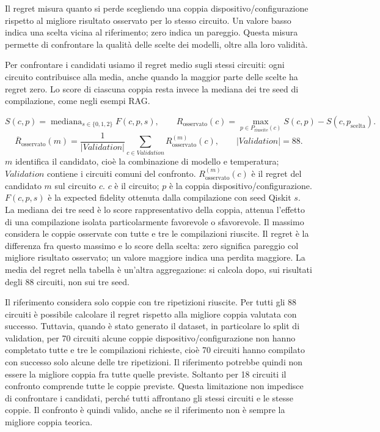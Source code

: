 Il regret misura quanto si perde scegliendo una coppia dispositivo/configurazione rispetto al migliore risultato osservato per lo stesso circuito. Un valore basso indica una scelta vicina al riferimento; zero indica un pareggio. Questa misura permette di confrontare la qualit\`a delle scelte dei modelli, oltre alla loro validit\`a.

Per confrontare i candidati usiamo il regret medio sugli stessi circuiti: ogni circuito contribuisce alla media, anche quando la maggior parte delle scelte ha regret zero. Lo score di ciascuna coppia resta invece la mediana dei tre seed di compilazione, come negli esempi RAG.

\[
 S(c,p)=\operatorname{mediana}_{s\in\{0,1,2\}} F(c,p,s), \qquad
 R_{\mathrm{osservato}}(c)=\max_{p\in P_{\mathrm{riuscite}}(c)}S(c,p)-S(c,p_{\mathrm{scelta}}).
\]
\[
 \overline{R}_{\mathrm{osservato}}(m)=\frac{1}{|Validation|}\sum_{c\in Validation}R_{\mathrm{osservato}}^{(m)}(c),
 \qquad |Validation|=88.
\]
$m$ identifica il candidato, cio\`e la combinazione di modello e temperatura; $Validation$ contiene i circuiti comuni del confronto. $R_{\mathrm{osservato}}^{(m)}(c)$ \`e il regret del candidato $m$ sul circuito $c$.
$c$ è il circuito; $p$ è la coppia dispositivo/configurazione.
$F(c,p,s)$ è la expected fidelity ottenuta dalla compilazione con seed Qiskit $s$.
La mediana dei tre seed è lo score rappresentativo della coppia, attenua l'effetto di una compilazione isolata
particolarmente favorevole o sfavorevole. Il massimo considera le coppie osservate
con tutte e tre le compilazioni riuscite.
Il regret è la differenza fra questo massimo e lo score della scelta:
zero significa pareggio col migliore risultato osservato; un valore maggiore
indica una perdita maggiore.
La media del regret nella tabella è un'altra aggregazione:
si calcola dopo, sui risultati degli 88 circuiti, non sui tre seed.

Il riferimento considera solo coppie con tre ripetizioni riuscite. Per tutti gli 88 circuiti è possibile calcolare il regret rispetto alla migliore coppia valutata con successo. 
Tuttavia, quando è stato generato il dataset, in particolare lo split di validation, per 70 circuiti alcune coppie dispositivo/configurazione non hanno completato tutte e tre le compilazioni richieste, cioè 70 circuiti hanno compilato con successo solo alcune delle tre ripetizioni. Il riferimento potrebbe quindi non essere la migliore coppia fra tutte quelle previste. Soltanto per 18 circuiti il confronto comprende tutte le coppie previste.
Questa limitazione non impedisce di confrontare i candidati, perché tutti affrontano gli stessi circuiti e le stesse coppie. Il confronto è quindi valido, anche se il riferimento non è sempre la migliore coppia teorica.

